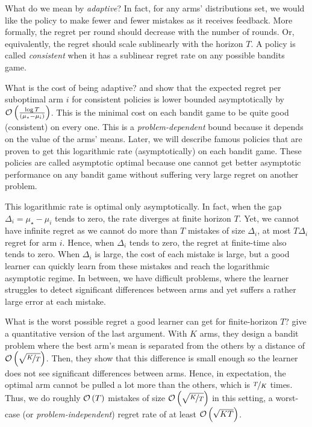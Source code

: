 {What do we mean by \emph{adaptive}? In fact, for any arms' distributions set, we would like the policy to make fewer and fewer mistakes as it receives feedback. More formally, the regret per round should decrease with the number of rounds. Or, equivalently, the regret should scale sublinearly with the horizon $T$. A policy is called \emph{consistent} when it has a sublinear regret rate on any possible bandits game. 

What is the cost of being adaptive? \citet{lai1985asymptotically} and \citet{burnetas1996optimal} show that the expected regret per suboptimal arm $i$ for consistent policies is lower bounded asymptotically by $\mathcal{O}\left(\frac{\log{T}}{\left(\mu_\star -\mu_i\right)}\right)$. This is the minimal cost on each bandit game to be quite good (\ie consistent) on every one. This is a \emph{problem-dependent} bound because it depends on the value of the arms' means. Later, we will describe famous policies that are proven to get this logarithmic rate (asymptotically) on each bandit game. These policies are called asymptotic optimal because one cannot get better asymptotic performance on any bandit game without suffering very large regret on another problem. 

This logarithmic rate is optimal only asymptotically. In fact, when the gap $\Delta_i = \mu_\star -\mu_i$ tends to zero, the rate diverges at finite horizon $T$. Yet, we cannot have infinite regret as we cannot do more than $T$ mistakes of size $\Delta_i$, \ie at most $T\Delta_i$ regret for arm $i$. Hence, when $\Delta_i$ tends to zero, the regret at finite-time also tends to zero. When $\Delta_i$ is large, the cost of each mistake is large, but a good learner can quickly learn from these mistakes and reach the logarithmic asymptotic regime. In between, we have difficult problems, where the learner struggles to detect significant differences between arms and yet suffers a rather large error at each mistake. 

What is the worst possible regret a good learner can get for finite-horizon $T$?  \citet{auer2002nonstochastic} give a quantitative version of the last argument. With $K$ arms, they design a bandit problem where the best arm's mean is separated from the others by a distance of $\mathcal{O}\left(\sqrt{\nicefrac{K}{T}}\right)$. Then, they show that this difference is small enough so the learner does not see significant differences between arms. Hence, in expectation, the optimal arm cannot be pulled a lot more than the others, which is $\nicefrac{T}{K}$ times. Thus, we do roughly $\mathcal{O}\left(T\right)$ mistakes of size $\mathcal{O}\left(\sqrt{\nicefrac{K}{T}}\right)$ in this setting, \ie a worst-case (or \emph{problem-independent}) regret rate of at least $\mathcal{O}\left(\sqrt{KT}\right)$. 

}
